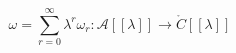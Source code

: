 \begin{equation}
        \label{eq:defposfun}
        \omega = \sum_{r=0}^\infty \lambda^r \omega_r:
        \mathcal{A}[[\lambda]] \to \ring{C}[[\lambda]]
    \end{equation}

